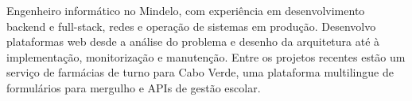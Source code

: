 
\begin{cvparagraph}
Engenheiro informático no Mindelo, com experiência em desenvolvimento backend e full-stack, redes e operação de sistemas em produção. Desenvolvo plataformas web desde a análise do problema e desenho da arquitetura até à implementação, monitorização e manutenção. Entre os projetos recentes estão um serviço de farmácias de turno para Cabo Verde, uma plataforma multilingue de formulários para mergulho e APIs de gestão escolar.
\end{cvparagraph}
